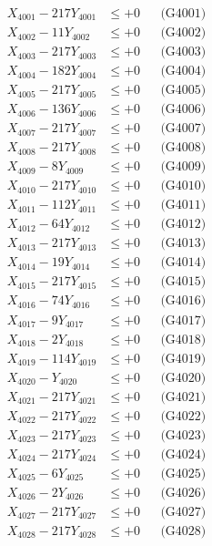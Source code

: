 \documentclass[a4paper,10pt]{article}
\begin{document}
{\begin{align}
\allowbreak
X_{4001} - 217Y_{4001} &\leq +0 && \text{(G4001)} \\
X_{4002} - 11Y_{4002} &\leq +0 && \text{(G4002)} \\
X_{4003} - 217Y_{4003} &\leq +0 && \text{(G4003)} \\
X_{4004} - 182Y_{4004} &\leq +0 && \text{(G4004)} \\
X_{4005} - 217Y_{4005} &\leq +0 && \text{(G4005)} \\
X_{4006} - 136Y_{4006} &\leq +0 && \text{(G4006)} \\
X_{4007} - 217Y_{4007} &\leq +0 && \text{(G4007)} \\
X_{4008} - 217Y_{4008} &\leq +0 && \text{(G4008)} \\
X_{4009} - 8Y_{4009} &\leq +0 && \text{(G4009)} \\
X_{4010} - 217Y_{4010} &\leq +0 && \text{(G4010)} \\
\allowbreak
X_{4011} - 112Y_{4011} &\leq +0 && \text{(G4011)} \\
X_{4012} - 64Y_{4012} &\leq +0 && \text{(G4012)} \\
X_{4013} - 217Y_{4013} &\leq +0 && \text{(G4013)} \\
X_{4014} - 19Y_{4014} &\leq +0 && \text{(G4014)} \\
X_{4015} - 217Y_{4015} &\leq +0 && \text{(G4015)} \\
X_{4016} - 74Y_{4016} &\leq +0 && \text{(G4016)} \\
X_{4017} - 9Y_{4017} &\leq +0 && \text{(G4017)} \\
X_{4018} - 2Y_{4018} &\leq +0 && \text{(G4018)} \\
X_{4019} - 114Y_{4019} &\leq +0 && \text{(G4019)} \\
X_{4020} - Y_{4020} &\leq +0 && \text{(G4020)} \\
\allowbreak
X_{4021} - 217Y_{4021} &\leq +0 && \text{(G4021)} \\
X_{4022} - 217Y_{4022} &\leq +0 && \text{(G4022)} \\
X_{4023} - 217Y_{4023} &\leq +0 && \text{(G4023)} \\
X_{4024} - 217Y_{4024} &\leq +0 && \text{(G4024)} \\
X_{4025} - 6Y_{4025} &\leq +0 && \text{(G4025)} \\
X_{4026} - 2Y_{4026} &\leq +0 && \text{(G4026)} \\
X_{4027} - 217Y_{4027} &\leq +0 && \text{(G4027)} \\
X_{4028} - 217Y_{4028} &\leq +0 && \text{(G4028)} \\

\end{align}}
\end{document}
